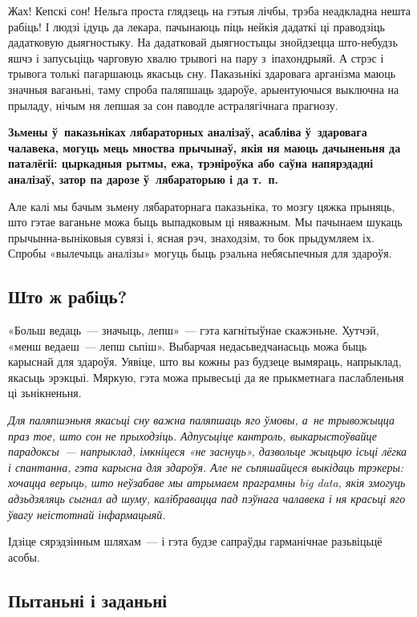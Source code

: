 Жах! Кепскі сон! Нельга проста глядзець на гэтыя лічбы, трэба неадкладна нешта рабіць! І людзі ідуць да лекара, пачынаюць піць нейкія дадаткі ці праводзіць дадатковую дыягностыку. На дадатковай дыягностыцы знойдзецца што-небудзь яшчэ і запусьціць чарговую хвалю трывогі на пару з~іпахондрыяй. А стрэс і трывога толькі пагаршаюць якасьць сну. Паказьнікі здаровага арганізма маюць значныя ваганьні, таму спроба паляпшаць здароўе, арыентуючыся выключна на прыладу, нічым ня лепшая за сон паводле астралягічнага прагнозу.

\textbf{Зьмены ў~паказьніках лябараторных аналізаў, асабліва ў~здаровага чалавека, могуць мець мноства прычынаў, якія ня маюць дачыненьня да паталёгіі: цыркадныя рытмы, ежа, трэніроўка або саўна напярэдадні аналізаў, затор па дарозе ў~лябараторыю і да т.~п.}

Але калі мы бачым зьмену лябараторнага паказьніка, то мозгу цяжка прыняць, што гэтае ваганьне можа быць выпадковым ці няважным. Мы пачынаем шукаць прычынна-выніковыя сувязі і, ясная рэч, знаходзім, то бок прыдумляем іх. Спробы «вылечыць аналізы» могуць быць рэальна небясьпечныя для здароўя.

\subsection*{Што ж рабіць?}

«Больш ведаць~--- значыць, лепш»~--- гэта кагнітыўнае скажэньне. Хутчэй, «менш ведаеш~--- лепш сьпіш». Выбарчая недасьведчанасьць можа быць карыснай для здароўя. Уявіце, што вы кожны раз будзеце вымяраць, напрыклад, якасьць эрэкцыі. Мяркую, гэта можа прывесьці да яе прыкметнага паслабленьня ці зьнікненьня.

\emph{Для паляпшэньня якасьці сну важна паляпшаць яго ўмовы, а~не трывожыцца праз тое, што сон не прыходзіць. Адпусьціце кантроль, выкарыстоўвайце парадоксы~--- напрыклад, імкніцеся «не заснуць», дазвольце жыцьцю ісьці лёгка і спантанна, гэта карысна для здароўя. Але не сьпяшайцеся выкідаць трэкеры: хочацца верыць, што неўзабаве мы атрымаем праграмны big data, якія змогуць адзьдзяляць сыгнал ад шуму, калібравацца пад пэўнага чалавека і ня красьці яго ўвагу неістотнай інфармацыяй.}

Ідзіце сярэдзінным шляхам~--- і гэта будзе сапраўды гарманічнае разьвіцьцё асобы.

\subsection*{Пытаньні і заданьні}

